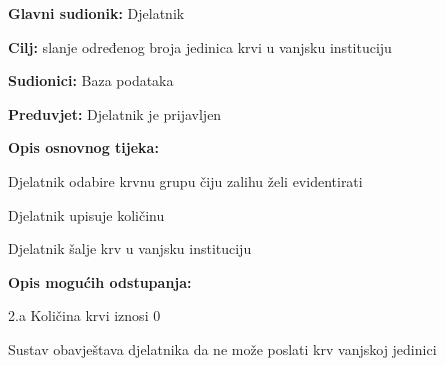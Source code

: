 \documentclass[11pt]{book}
\begin{document}
\noindent {}
					\begin{packed_item}
	
						\item \textbf{Glavni sudionik: }Djelatnik
						\item \textbf{Cilj:} slanje određenog broja jedinica krvi u vanjsku instituciju
						\item \textbf{Sudionici:} Baza podataka
						\item \textbf{Preduvjet:} Djelatnik je prijavljen
						\item \textbf{Opis osnovnog tijeka:}
						
						\item[] \begin{packed_enum}
	
							\item Djelatnik odabire krvnu grupu čiju zalihu želi evidentirati
							\item Djelatnik upisuje količinu
							\item Djelatnik šalje krv u vanjsku instituciju
						\end{packed_enum}
						\item  \textbf{Opis mogućih odstupanja:}
						
						\item[] \begin{packed_item}
	
							\item[2.a] Količina krvi iznosi 0
							\item[] \begin{packed_enum}
								
								\item  Sustav obavještava djelatnika da ne može poslati krv vanjskoj jedinici

								
							\end{packed_enum}
					\end{packed_item}
					\end{packed_item}
\end{document}

